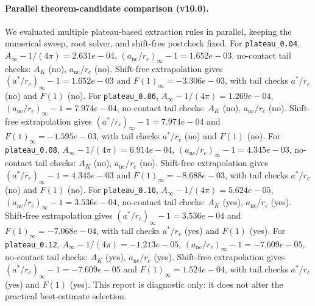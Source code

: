 \paragraph{Parallel theorem-candidate comparison (v10.0).}
We evaluated multiple plateau-based extraction rules in parallel, keeping the numerical sweep, root solver, and shift-free postcheck fixed. For \texttt{plateau_0.04}, $A_\infty-1/(4\pi)=2.631e-04$, $(a_{\mathrm{nc}}/r_c)_\infty-1=1.652e-03$, no-contact tail checks: $A_K$ (no), $a_{\mathrm{nc}}/r_c$ (no). Shift-free extrapolation gives $(a^*/r_c)_\infty-1=1.652e-03$ and $F(1)_\infty=-3.306e-03$, with tail checks $a^*/r_c$ (no) and $F(1)$ (no). For \texttt{plateau_0.06}, $A_\infty-1/(4\pi)=1.269e-04$, $(a_{\mathrm{nc}}/r_c)_\infty-1=7.974e-04$, no-contact tail checks: $A_K$ (no), $a_{\mathrm{nc}}/r_c$ (no). Shift-free extrapolation gives $(a^*/r_c)_\infty-1=7.974e-04$ and $F(1)_\infty=-1.595e-03$, with tail checks $a^*/r_c$ (no) and $F(1)$ (no). For \texttt{plateau_0.08}, $A_\infty-1/(4\pi)=6.914e-04$, $(a_{\mathrm{nc}}/r_c)_\infty-1=4.345e-03$, no-contact tail checks: $A_K$ (no), $a_{\mathrm{nc}}/r_c$ (no). Shift-free extrapolation gives $(a^*/r_c)_\infty-1=4.345e-03$ and $F(1)_\infty=-8.688e-03$, with tail checks $a^*/r_c$ (no) and $F(1)$ (no). For \texttt{plateau_0.10}, $A_\infty-1/(4\pi)=5.624e-05$, $(a_{\mathrm{nc}}/r_c)_\infty-1=3.536e-04$, no-contact tail checks: $A_K$ (yes), $a_{\mathrm{nc}}/r_c$ (yes). Shift-free extrapolation gives $(a^*/r_c)_\infty-1=3.536e-04$ and $F(1)_\infty=-7.068e-04$, with tail checks $a^*/r_c$ (yes) and $F(1)$ (yes). For \texttt{plateau_0.12}, $A_\infty-1/(4\pi)=-1.213e-05$, $(a_{\mathrm{nc}}/r_c)_\infty-1=-7.609e-05$, no-contact tail checks: $A_K$ (yes), $a_{\mathrm{nc}}/r_c$ (yes). Shift-free extrapolation gives $(a^*/r_c)_\infty-1=-7.609e-05$ and $F(1)_\infty=1.524e-04$, with tail checks $a^*/r_c$ (yes) and $F(1)$ (yes). This report is diagnostic only: it does not alter the practical best-estimate selection.
